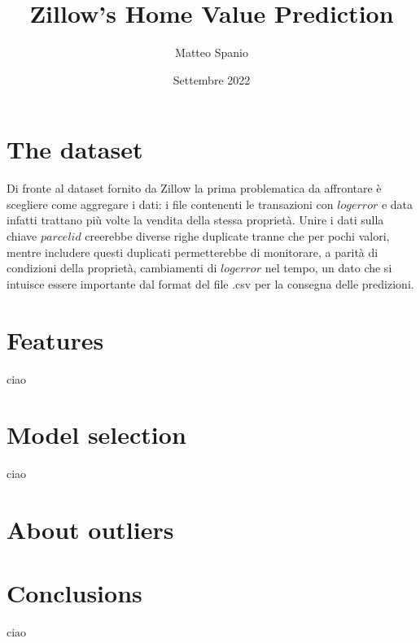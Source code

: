 \documentclass[12pt, twoside]{article}
\title{Zillow’s Home Value Prediction}
\author{Matteo Spanio}
\date{Settembre 2022}
\begin{document}
    

    
    \onehalfspacing


    \section{The dataset}
    
    Di fronte al dataset fornito da Zillow la prima problematica da affrontare è scegliere come aggregare i dati: i file contenenti le transazioni con $logerror$ e data infatti trattano più volte la vendita della stessa proprietà. Unire i dati sulla chiave $parcelid$ creerebbe diverse righe duplicate tranne che per pochi valori, mentre includere questi duplicati permetterebbe di monitorare, a parità di condizioni della proprietà, cambiamenti di $logerror$ nel tempo, un dato che si intuisce essere importante dal format del file .csv per la consegna delle predizioni.

    \section{Features}
    ciao

    \section{Model selection}
    ciao

    \section{About outliers}

    \section{Conclusions}
    ciao
\end{document}
